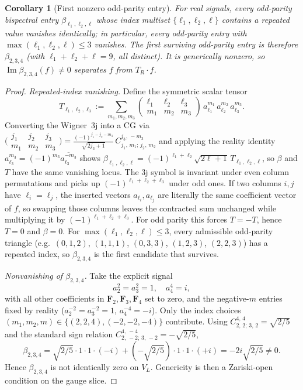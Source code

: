 \documentclass[11pt]{article}
\theoremstyle{plain}
\newtheorem{corollary}[theorem]{Corollary}
\theoremstyle{definition}
\theoremstyle{remark}
\DeclareMathOperator{\im}{Im}
\newcommand{\CG}[6]{C^{#5,\,#6}_{#1,\,#2;\,#3,\,#4}}
\newcommand{\conj}[1]{\overline{#1}}
\begin{document}
\begin{corollary}[First nonzero odd-parity entry]\label{cor:first-odd}
For real signals, every odd-parity bispectral entry
$\beta_{\ell_1,\ell_2,\ell}$ whose index multiset
$\{\ell_1,\ell_2,\ell\}$ contains a repeated value vanishes
identically; in particular, every odd-parity entry with
$\max(\ell_1,\ell_2,\ell)\le3$ vanishes. The first surviving
odd-parity entry is therefore $\beta_{2,3,4}$
(with $\ell_1+\ell_2+\ell=9$, all distinct). It is generically
nonzero, so $\im\beta_{2,3,4}(f)\ne0$ separates $f$ from $T_R\cdot f$.
\end{corollary}
\begin{proof}
\emph{Repeated-index vanishing.} Define the symmetric scalar tensor
\[
  T_{\ell_1,\ell_2,\ell_3}
  := \sum_{m_1,m_2,m_3}
       \begin{pmatrix} \ell_1 & \ell_2 & \ell_3 \\
                       m_1 & m_2 & m_3 \end{pmatrix}\,
       a_{\ell_1}^{m_1}\, a_{\ell_2}^{m_2}\, a_{\ell_3}^{m_3} .
\]
Converting the Wigner~$3$j into a CG via
$\bigl(\begin{smallmatrix} j_1 & j_2 & j_3 \\
       m_1 & m_2 & m_3\end{smallmatrix}\bigr)
=\frac{(-1)^{j_1-j_2-m_3}}{\sqrt{2j_3+1}}\,
\CG{j_1}{m_1}{j_2}{m_2}{j_3}{-m_3}$ and applying the reality identity
$a_{\ell_3}^{m_3}=(-1)^{m_3}\conj{a_{\ell_3}^{-m_3}}$ shows
$\beta_{\ell_1,\ell_2,\ell}=(-1)^{\ell_1+\ell_2}\sqrt{2\ell+1}\,
T_{\ell_1,\ell_2,\ell}$, so $\beta$ and $T$ have the same vanishing
locus. The 3j symbol is invariant under even column permutations and
picks up $(-1)^{\ell_1+\ell_2+\ell_3}$ under odd ones. If two columns
$i,j$ have $\ell_i=\ell_j$, the inserted vectors $a_{\ell_i},
a_{\ell_j}$ are literally the same coefficient vector of $f$, so
swapping those columns leaves the contracted sum unchanged while
multiplying it by $(-1)^{\ell_1+\ell_2+\ell_3}$. For odd parity this
forces $T=-T$, hence $T=0$ and $\beta=0$.
For $\max(\ell_1,\ell_2,\ell)\le3$, every admissible odd-parity
triangle (e.g.\ $(0,1,2)$, $(1,1,1)$, $(0,3,3)$, $(1,2,3)$, $(2,2,3)$)
has a repeated index, so $\beta_{2,3,4}$ is the first candidate that
survives.

\emph{Nonvanishing of $\beta_{2,3,4}$.} Take the explicit signal
\[
  a_2^2 = a_3^2 = 1, \quad a_4^4 = i,
\]
with all other coefficients in $\mathbf{F}_2,\mathbf{F}_3,\mathbf{F}_4$
set to zero, and the negative-$m$ entries fixed by reality
($a_2^{-2}=a_3^{-2}=1$, $a_4^{-4}=-i$). Only the index choices
$(m_1,m_2,m)\in\{(2,2,4),(-2,-2,-4)\}$ contribute. Using
$\CG{2}{2}{3}{2}{4}{4}=\sqrt{2/5}$ and the standard sign relation
$\CG{2}{-2}{3}{-2}{4}{-4}=-\sqrt{2/5}$,
\[
  \beta_{2,3,4}
  = \sqrt{2/5}\cdot 1\cdot1\cdot(-i)
   + (-\sqrt{2/5})\cdot 1\cdot1\cdot(+i)
  = -2i\sqrt{2/5}\ne0.
\]
Hence $\beta_{2,3,4}$ is not identically zero on $V_L$. Genericity is
then a Zariski-open condition on the gauge slice.
\end{proof}
\end{document}
